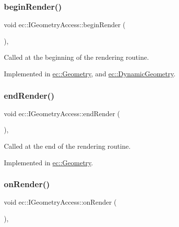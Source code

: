 \subsubsection{\texorpdfstring{begin\+Render()}{beginRender()}}
{\footnotesize\ttfamily void ec\+::\+I\+Geometry\+Access\+::begin\+Render (\begin{DoxyParamCaption}{ }\end{DoxyParamCaption})\hspace{0.3cm}{\ttfamily [protected]}, {}}



Called at the beginning of the rendering routine. 



Implemented in \mbox{\hyperlink{classec_1_1_geometry_aeca5f0e52e7c2e4b352ede1a6e7c3f5b}{ec\+::\+Geometry}}, and \mbox{\hyperlink{classec_1_1_dynamic_geometry_ae4eb49e852a4c300325a288bf9ea4408}{ec\+::\+Dynamic\+Geometry}}.

\mbox{\label{classec_1_1_i_geometry_access_a6d3b9c34a8b73aeac26663ef349ce41f}} 
\subsubsection{\texorpdfstring{end\+Render()}{endRender()}}
{\footnotesize\ttfamily void ec\+::\+I\+Geometry\+Access\+::end\+Render (\begin{DoxyParamCaption}{ }\end{DoxyParamCaption})\hspace{0.3cm}{\ttfamily [protected]}, {}}



Called at the end of the rendering routine. 



Implemented in \mbox{\hyperlink{classec_1_1_geometry_ae0352702162501df185517e84c3b02bd}{ec\+::\+Geometry}}.

\mbox{\label{classec_1_1_i_geometry_access_a2ee418c9fa4eb266347bae2f0ef8095b}} 
\subsubsection{\texorpdfstring{on\+Render()}{onRender()}}
{\footnotesize\ttfamily void ec\+::\+I\+Geometry\+Access\+::on\+Render (\begin{DoxyParamCaption}{ }\end{DoxyParamCaption})\hspace{0.3cm}{\ttfamily [protected]}, {}}



